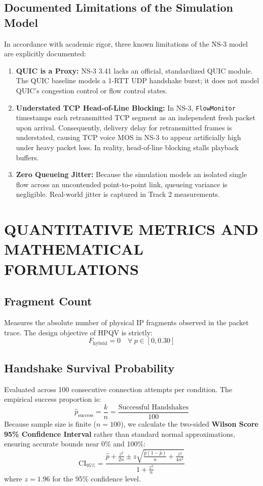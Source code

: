 \subsection{Documented Limitations of the Simulation Model}
In accordance with academic rigor, three known limitations of the NS-3 model are explicitly documented:
\begin{enumerate}
    \item \textbf{QUIC is a Proxy:} NS-3 3.41 lacks an official, standardized QUIC module. The QUIC baseline models a 1-RTT UDP handshake burst; it does not model QUIC's congestion control or flow control states.
    \item \textbf{Understated TCP Head-of-Line Blocking:} In NS-3, \texttt{FlowMonitor} timestamps each retransmitted TCP segment as an independent fresh packet upon arrival. Consequently, delivery delay for retransmitted frames is understated, causing TCP voice MOS in NS-3 to appear artificially high under heavy packet loss. In reality, head-of-line blocking stalls playback buffers.
    \item \textbf{Zero Queueing Jitter:} Because the simulation models an isolated single flow across an uncontended point-to-point link, queueing variance is negligible. Real-world jitter is captured in Track 2 measurements.
\end{enumerate}

\section{QUANTITATIVE METRICS AND MATHEMATICAL FORMULATIONS}

\subsection{Fragment Count}
Measures the absolute number of physical IP fragments observed in the packet trace. The design objective of HPQV is strictly:
\begin{equation}
    F_{\text{hybrid}} = 0\quad \forall\ p \in [0, 0.30]
\end{equation}

\subsection{Handshake Survival Probability}
Evaluated across 100 consecutive connection attempts per condition. The empirical success proportion is:
\begin{equation}
    \hat{p}_{\text{success}} = \frac{k}{n} = \frac{\text{Successful Handshakes}}{100}
\end{equation}
Because sample size is finite ($n=100$), we calculate the two-sided \textbf{Wilson Score 95\% Confidence Interval} rather than standard normal approximations, ensuring accurate bounds near 0\% and 100\%:
\begin{equation}
    \text{CI}_{95\%} = \frac{\hat{p} + \frac{z^2}{2n} \pm z \sqrt{\frac{\hat{p}(1-\hat{p})}{n} + \frac{z^2}{4n^2}}}{1 + \frac{z^2}{n}}
\end{equation}
where $z = 1.96$ for the 95\% confidence level.

